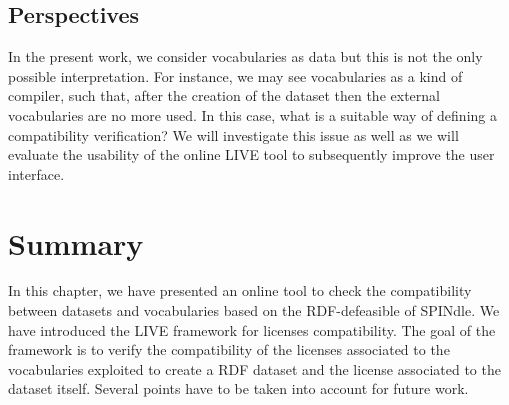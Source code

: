 \subsection{Perspectives}\label{sec:perspec}
In the present work, we consider vocabularies as data but this is not the only possible interpretation. For instance, we may see vocabularies as a kind of compiler, such that, after the creation of the dataset then the external vocabularies are no more used. In this case, what is a suitable way of defining a compatibility verification? We will investigate this issue as well as we will evaluate the usability of the online LIVE tool to subsequently improve the user interface.

\section{Summary}
\label{sec:summary-ch6}
In this chapter, we have presented an online tool to check the compatibility between datasets and vocabularies based on the RDF-defeasible of SPINdle. We have introduced the LIVE framework for licenses compatibility. The goal of the framework is to verify the compatibility of the licenses associated to the vocabularies exploited to create a RDF dataset and the license associated to the dataset itself. Several points have to be taken into account for future work.
